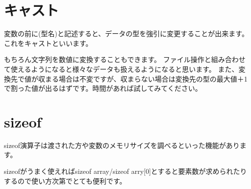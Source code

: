 \section{キャスト}
変数の前に(型名)と記述すると、データの型を強引に変更することが出来ます。これをキャストといいます。



もちろん文字列を数値に変換することもできます。
ファイル操作と組み合わせて使えるようになると様々なデータも扱えるようになると思います。
また、変換先で値が収まる場合は不変ですが、収まらない場合は変換先の型の最大値＋1で割った値が出るはずです。時間があれば試してみてください。

\section{sizeof}
sizeof演算子は渡された方や変数のメモリサイズを調べるといった機能があります。

sizeofがうまく使えればsizeof array/sizeof arry[0]とすると要素数が求められたりするので使い方次第でとても便利です。